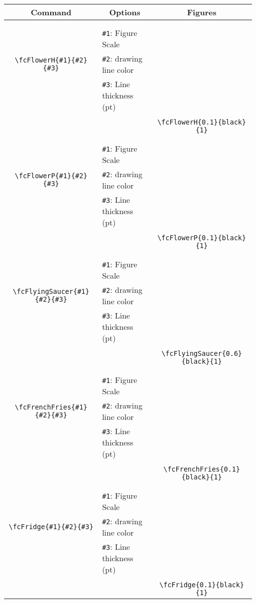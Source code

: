 \documentclass[x11names]{article}
\begin{document}
\begin{table}[H]\centering\begin{tabular}{|c|l|c|}\hline {\bf Command}& \multicolumn{1}{c|}{{\bf Options}} & {\bf Figures}\\  \hline	&&\multirow{5}{*}{\fcFlowerH{0.1}{black}{1}}\\	&&\\	&\verb|#1|: Figure Scale &\\	\verb|\fcFlowerH{#1}{#2}{#3}|&	\verb|#2|: drawing line color &\\	&\verb|#3|: Line thickness (pt) &\\ &&\\&&	\verb|\fcFlowerH{0.1}{black}{1}|\\\hline 	
	&&\multirow{5}{*}{\fcFlowerP{0.1}{black}{1}}\\	&&\\	&\verb|#1|: Figure Scale &\\	\verb|\fcFlowerP{#1}{#2}{#3}|&	\verb|#2|: drawing line color &\\	&\verb|#3|: Line thickness (pt) &\\ &&\\&&	\verb|\fcFlowerP{0.1}{black}{1}|\\\hline 	
	&&\multirow{5}{*}{\fcFlyingSaucer{0.6}{black}{1}}\\	&&\\	&\verb|#1|: Figure Scale &\\	\verb|\fcFlyingSaucer{#1}{#2}{#3}|&	\verb|#2|: drawing line color &\\	&\verb|#3|: Line thickness (pt) &\\ &&\\&&	\verb|\fcFlyingSaucer{0.6}{black}{1}|\\\hline 	
	&&\multirow{5}{*}{\fcFrenchFries{0.1}{black}{1}}\\	&&\\	&\verb|#1|: Figure Scale &\\	\verb|\fcFrenchFries{#1}{#2}{#3}|&	\verb|#2|: drawing line color &\\	&\verb|#3|: Line thickness (pt) &\\ &&\\&&	\verb|\fcFrenchFries{0.1}{black}{1}|\\\hline 	
	&&\multirow{5}{*}{\fcFridge{0.1}{black}{1}}\\	&&\\	&\verb|#1|: Figure Scale &\\	\verb|\fcFridge{#1}{#2}{#3}|&	\verb|#2|: drawing line color &\\	&\verb|#3|: Line thickness (pt) &\\ &&\\&&	\verb|\fcFridge{0.1}{black}{1}|\\\hline 	

\end{tabular}
\end{table}
\end{document}
